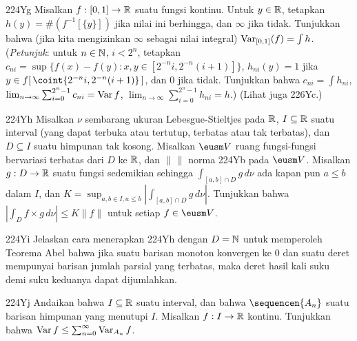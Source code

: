 {\spheader 224Yg Misalkan $f:[0,1]\to\Bbb R$ suatu fungsi kontinu. Untuk
$y\in\Bbb R$, tetapkan $h(y)=\#(f^{-1}[\{y\}])$ jika nilai ini berhingga,
dan $\infty$ jika tidak. Tunjukkan bahwa (jika kita mengizinkan $\infty$
sebagai nilai integral) $\mathop{\text{Var}}_{[0,1]}(f)=\int h$. ({\it Petunjuk\/}:
untuk $n\in\Bbb N$, $i<2^n$, tetapkan
$c_{ni}=\sup\{f(x)-f(y):x,y\in[2^{-n}i,2^{-n}(i+1)]\}$,
$h_{ni}(y)=1$ jika $y\in f[\,\coint{2^{-n}i,2^{-n}(i+1)}\,]$, dan $0$
jika tidak. Tunjukkan bahwa $c_{ni}=\int h_{ni}$,
$\lim_{n\to\infty}\sum_{i=0}^{2^n-1}c_{ni}=\mathop{\text{Var}} f$,
$\lim_{n\to\infty}\sum_{i=0}^{2^n-1}h_{ni}=h$.)
(Lihat juga 226Yc.)

\spheader 224Yh Misalkan $\nu$ sembarang ukuran Lebesgue-Stieltjes pada
$\Bbb R$, $I\subseteq \Bbb R$ suatu interval (yang dapat terbuka atau
tertutup, terbatas atau tak terbatas), dan $D\subseteq I$ suatu himpunan
tak kosong. Misalkan $\eusm V$ ruang fungsi-fungsi bervariasi terbatas
dari $D$ ke $\Bbb R$, dan $\|\,\|$ norma 224Yb pada $\eusm V$. Misalkan
$g:D\to\Bbb R$ suatu fungsi sedemikian sehingga
$\int_{[a,b]\cap D}g\,d\nu$ ada kapan pun $a\le b$ dalam $I$, dan
$K=\sup_{a,b\in I,a\le  b}|\int_{[a,b]\cap D}g\,d\nu|$.
Tunjukkan bahwa $|\int_Df\times g\,d\nu|\le K\|f\|$ untuk setiap
$f\in\eusm V$.

\spheader 224Yi Jelaskan cara menerapkan 224Yh dengan $D=\Bbb N$ untuk
memperoleh Teorema Abel bahwa jika suatu barisan monoton konvergen ke $0$
dan suatu deret mempunyai barisan jumlah parsial yang terbatas, maka deret
hasil kali suku demi suku keduanya dapat dijumlahkan.

\spheader 224Yj Andaikan bahwa $I\subseteq\Bbb R$ suatu interval, dan
bahwa $\sequencen{A_n}$ suatu barisan himpunan yang menutupi $I$.
Misalkan $f:I\to\Bbb R$ kontinu. Tunjukkan bahwa
$\mathop{\text{Var}} f\le\sum_{n=0}^{\infty}\mathop{\text{Var}}_{A_n}f$.
}%

